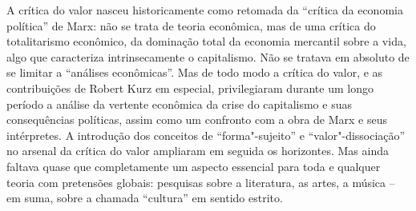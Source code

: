 A crítica do valor nasceu historicamente como retomada da ``crítica da
economia política'' de Marx: não se trata de teoria econômica, mas de
uma crítica do totalitarismo econômico, da dominação total da economia
mercantil sobre a vida, algo que caracteriza intrinsecamente o
capitalismo. Não se tratava em absoluto de se limitar a ``análises
econômicas''. Mas de todo modo a crítica do valor, e as contribuições de
Robert Kurz em especial, privilegiaram durante um longo período a
análise da vertente econômica da crise do capitalismo e suas
consequências políticas, assim como um confronto com a obra de Marx e
seus intérpretes. A introdução dos conceitos de ``forma"-sujeito'' e
``valor"-dissociação'' no arsenal da crítica do valor ampliaram em
seguida os horizontes. Mas ainda faltava quase que completamente um
aspecto essencial para toda e qualquer teoria com pretensões globais:
pesquisas sobre a literatura, as artes, a música -- em suma, sobre a
chamada ``cultura'' em sentido estrito.

